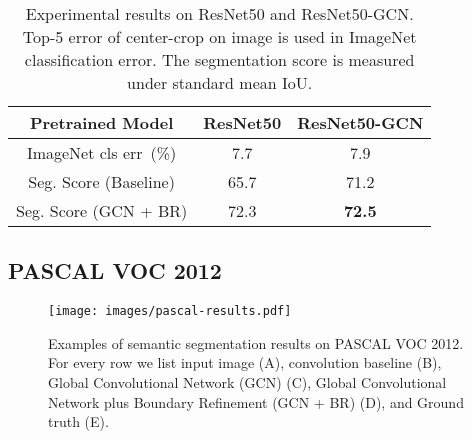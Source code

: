 \documentclass[10pt,twocolumn,letterpaper]{article}
\begin{document}
   \begin{table}[h]
      \begin{center}
         \begin{tabular}{|c|c|c|}
            \hline
            Pretrained Model & ResNet50 & ResNet50-GCN \\
            \hline
            ImageNet cls err~(\%) & 7.7 & 7.9 \\
            \hline
            Seg. Score (Baseline) &  65.7 &  71.2 \\
            \hline
            Seg. Score (GCN + BR) & 72.3 & \textbf{72.5}\\
            \hline
         \end{tabular}
      \end{center}
      \caption{Experimental results on ResNet50 and ResNet50-GCN. Top-5 error of  center-crop on  image is used in ImageNet classification error. The segmentation score is measured under standard mean IoU.}
      \label{table:exp-on-res50sp}
   \end{table}
\subsection{PASCAL VOC 2012}
   \begin{figure*}[htbp]
      \begin{center}
         \texttt{[image: images/pascal-results.pdf]}
      \end{center}
      \caption{Examples of semantic segmentation results on PASCAL VOC 2012. For every row we list input image (A),  convolution baseline (B), Global Convolutional Network (GCN) (C), Global Convolutional Network plus Boundary Refinement (GCN + BR) (D), and Ground truth (E). }
      \label{fig:pascal-results}
   \end{figure*}
\end{document}
